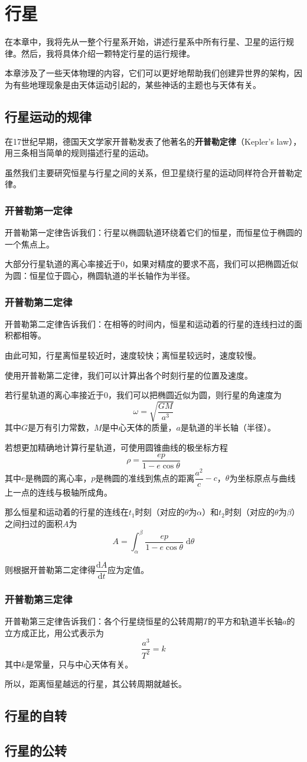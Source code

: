 \chapter{行星}
在本章中，我将先从一整个行星系开始，讲述行星系中所有行星、卫星的运行规律。然后，我将具体介绍一颗特定行星的运行规律。

本章涉及了一些天体物理的内容，它们可以更好地帮助我们创建异世界的架构，因为有些地理现象是由天体运动引起的，某些神话的主题也与天体有关。

\section{行星运动的规律}
在17世纪早期，德国天文学家开普勒发表了他著名的\textbf{开普勒定律}（Kepler's law），用三条相当简单的规则描述行星的运动。

虽然我们主要研究恒星与行星之间的关系，但卫星绕行星的运动同样符合开普勒定律。

\subsection{开普勒第一定律}
开普勒第一定律告诉我们：行星以椭圆轨道环绕着它们的恒星，而恒星位于椭圆的一个焦点上。

大部分行星轨道的离心率接近于0，如果对精度的要求不高，我们可以把椭圆近似为圆：恒星位于圆心，椭圆轨道的半长轴作为半径。

\subsection{开普勒第二定律}
开普勒第二定律告诉我们：在相等的时间内，恒星和运动着的行星的连线扫过的面积都相等。

由此可知，行星离恒星较近时，速度较快；离恒星较远时，速度较慢。

使用开普勒第二定律，我们可以计算出各个时刻行星的位置及速度。

若行星轨道的离心率接近于0，我们可以把椭圆近似为圆，则行星的角速度为\[\omega=\sqrt{\frac{GM}{a^3}}\]其中$G$是万有引力常数，$M$是中心天体的质量，$a$是轨道的半长轴（半径）。

若想更加精确地计算行星轨道，可使用圆锥曲线的极坐标方程\[\rho=\frac{ep}{1-e\cos\theta}\]其中$e$是椭圆的离心率，$p$是椭圆的准线到焦点的距离$\dfrac{a^2}{c}-c$，$\theta$为坐标原点与曲线上一点的连线与极轴所成角。

那么恒星和运动着的行星的连线在$t_1$时刻（对应的$\theta$为$\alpha$）和$t_2$时刻（对应的$\theta$为$\beta$）之间扫过的面积$A$为\[A=\int\nolimits_\alpha^\beta\frac{ep}{1-e\cos\theta}\;\mathrm{d}\theta\]

则根据开普勒第二定律得$\dfrac{\mathrm{d}A}{\mathrm{d}t}$应为定值。

\subsection{开普勒第三定律}
开普勒第三定律告诉我们：各个行星绕恒星的公转周期$T$的平方和轨道半长轴$a$的立方成正比，用公式表示为\[\frac{a^3}{T^2}=k\]其中$k$是常量，只与中心天体有关。

所以，距离恒星越远的行星，其公转周期就越长。

\section{行星的自转}

\section{行星的公转}
